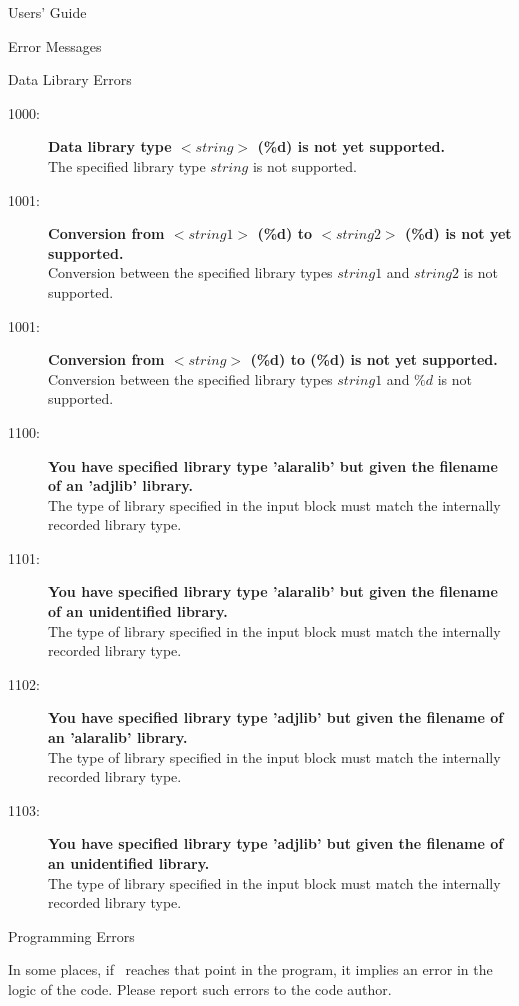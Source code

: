 \begin{chapter}{Users' Guide\label{app:user.guide}}
\begin{section}{Error Messages}
\begin{subsection}{Data Library Errors}
      \begin{description}
      \item[1000:]\textbf{Data library type $<\!\!string\!\!>$ (\%d) is
          not yet supported.}\ \\
        The specified library type $string$ is not supported.
      \item[1001:]\textbf{Conversion from $<\!\!string1\!\!>$ (\%d) to
          $<\!\!string2\!\!>$ (\%d) is not yet supported.}\ \\
        Conversion between the specified library types $string1$ and
        $string2$ is not supported.
      \item[1001:]\textbf{Conversion from $<\!\!string\!\!>$ (\%d) to
          (\%d) is not yet supported.}\ \\
        Conversion between the specified library types $string1$ and
        $\%d$ is not supported.
      \item[1100:]\textbf{You have specified library type 'alaralib' but
          given the filename of an 'adjlib' library.}\ \\
        The type of library specified in the input block must match the
        internally recorded library type.
      \item[1101:]\textbf{You have specified library type 'alaralib' but
          given the filename of an unidentified library.}\ \\
        The type of library specified in the input block must match the
        internally recorded library type.
      \item[1102:]\textbf{You have specified library type 'adjlib' but
          given the filename of an 'alaralib' library.}\ \\
        The type of library specified in the input block must match the
        internally recorded library type.
      \item[1103:]\textbf{You have specified library type 'adjlib' but
          given the filename of an unidentified library.}\ \\
        The type of library specified in the input block must match the
        internally recorded library type.
      \end{description}    
    \end{subsection}
    
    \begin{subsection}{Programming Errors}
      
      In some places, if \ALARA\ reaches that point in the program, it
      implies an error in the logic of the code.  Please report such
      errors to the code author.
      

\end{subsection}
\end{section}
\end{chapter}
